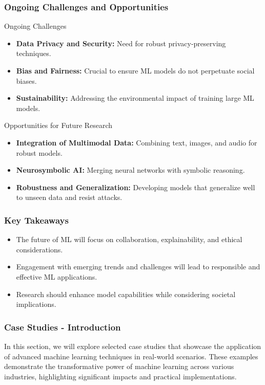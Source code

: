 \documentclass[aspectratio=169]{beamer}
\begin{document}
\begin{frame}[fragile]
    \frametitle{Ongoing Challenges and Opportunities}
    \begin{block}{Ongoing Challenges}
        \begin{itemize}
            \item \textbf{Data Privacy and Security:} Need for robust privacy-preserving techniques.
            \item \textbf{Bias and Fairness:} Crucial to ensure ML models do not perpetuate social biases.
            \item \textbf{Sustainability:} Addressing the environmental impact of training large ML models.
        \end{itemize}
    \end{block}

    \begin{block}{Opportunities for Future Research}
        \begin{itemize}
            \item \textbf{Integration of Multimodal Data:} Combining text, images, and audio for robust models.
            \item \textbf{Neurosymbolic AI:} Merging neural networks with symbolic reasoning.
            \item \textbf{Robustness and Generalization:} Developing models that generalize well to unseen data and resist attacks.
        \end{itemize}
    \end{block}
\end{frame}

\begin{frame}[fragile]
    \frametitle{Key Takeaways}
    \begin{itemize}
        \item The future of ML will focus on collaboration, explainability, and ethical considerations.
        \item Engagement with emerging trends and challenges will lead to responsible and effective ML applications.
        \item Research should enhance model capabilities while considering societal implications.
    \end{itemize}
\end{frame}

\begin{frame}[fragile]
  \frametitle{Case Studies - Introduction}
  In this section, we will explore selected case studies that showcase the application of advanced machine learning techniques in real-world scenarios. 
  These examples demonstrate the transformative power of machine learning across various industries, highlighting significant impacts and practical implementations.
\end{frame}
\end{document}
